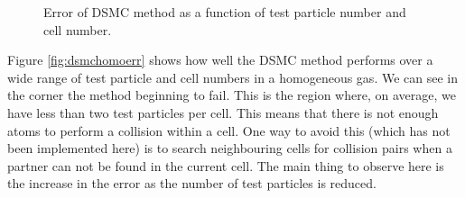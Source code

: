 \begin{figure}
\hspace{-8em}
\caption{Error of DSMC method as a function of test particle number and cell number.}\label{fig:dsmccolerr}
\end{figure}

Figure \ref{fig:dsmchomoerr} shows how well the DSMC method performs over a wide range of test particle and cell numbers in a homogeneous gas. 
We can see in the corner the method beginning to fail. 
This is the region where, on average, we have less than two test particles per cell. 
This means that there is not enough atoms to perform a collision within a cell. 
One way to avoid this (which has not been implemented here) is to search neighbouring cells for collision pairs when a partner can not be found in the current cell.
The main thing to observe here is the increase in the error as the number of test particles is reduced.

